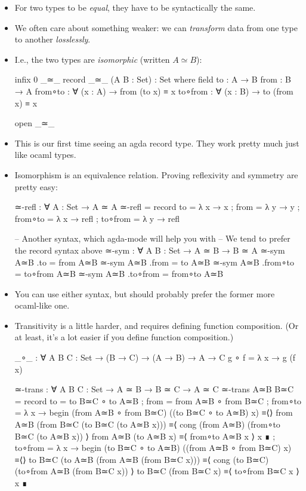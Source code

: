 \documentclass{lecturenotes}
\begin{document}
\begin{itemize}
\item For two types to be \emph{equal}, they have to be syntactically the same.
\item We often care about something weaker: we can \emph{transform} data from one type to another \emph{losslessly}.
\item I.e., the two types are \emph{isomorphic} (written $A \simeq B$):
\begin{code}
infix 0 _≃_
record _≃_ (A B : Set) : Set where
  field
    to : A → B
    from : B → A
    from∘to : ∀ (x : A) → from (to x) ≡ x
    to∘from : ∀ (x : B) → to (from x) ≡ x

open _≃_
\end{code}
\item This is our first time seeing an agda record type.
  They work pretty much just like ocaml types.
\item Isomorphism is an equivalence relation.
  Proving reflexivity and symmetry are pretty easy:
\begin{code}
≃-refl : ∀ {A : Set} → A ≃ A
≃-refl =
  record
  {
    to      = λ x → x
  ; from    = λ y → y
  ; from∘to = λ x → refl
  ; to∘from = λ y → refl
  }

-- Another syntax, which agda-mode will help you with
-- We tend to prefer the record syntax above
≃-sym : ∀ {A B : Set} → A ≃ B → B ≃ A
≃-sym A≃B .to = from A≃B
≃-sym A≃B .from = to A≃B
≃-sym A≃B .from∘to = to∘from A≃B
≃-sym A≃B .to∘from = from∘to A≃B
\end{code}
\item You can use either syntax, but should probably prefer the former more ocaml-like one.
\item Transitivity is a little harder, and requires defining function composition.
  (Or at least, it's a lot easier if you define function composition.)
\begin{code}
_∘_ : ∀ {A B C : Set} → (B → C) → (A → B) → A → C
g ∘ f = λ x → g (f x)


≃-trans : ∀ {A B C : Set} → A ≃ B → B ≃ C → A ≃ C
≃-trans A≃B B≃C =
  record
  {
    to      = to B≃C ∘ to A≃B
  ; from    = from A≃B ∘ from B≃C
  ; from∘to = λ {x →
      begin
        (from A≃B ∘ from B≃C) ((to B≃C ∘ to A≃B) x)
      ≡⟨⟩
        from A≃B (from B≃C (to B≃C (to A≃B x)))
      ≡⟨ cong (from A≃B) (from∘to B≃C (to A≃B x)) ⟩
        from A≃B (to A≃B x)
      ≡⟨ from∘to A≃B x ⟩
        x
      ∎}
  ; to∘from = λ {x → 
     begin
       (to B≃C ∘ to A≃B) ((from A≃B ∘ from B≃C) x)
     ≡⟨⟩
       to B≃C (to A≃B (from A≃B (from B≃C x)))
     ≡⟨ cong (to B≃C) (to∘from A≃B (from B≃C x)) ⟩
       to B≃C (from B≃C x)
     ≡⟨ to∘from B≃C x ⟩
       x
     ∎}
  }
\end{code}
\end{itemize}
\end{document}
